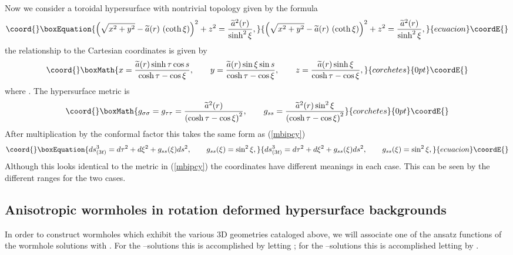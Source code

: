 \documentclass[a4paper,preprint,prabib,aps]{revtex4}
\begin{document}
Now we consider a toroidal hypersurface with nontrivial topology given by
the formula
\begin{equation}\coord{}\boxEquation{
\left( \sqrt{x^2+y^2}-\widetilde{a}(r)\ (\coth \xi )\right) ^2+z^2= \frac{
\widetilde{a}^2(r)}{\sinh ^2\xi },  \label{torus}
}{
\left( \sqrt{x^2+y^2}-\widetilde{a}(r)\ (\coth \xi )\right) ^2+z^2= \frac{
\widetilde{a}^2(r)}{\sinh ^2\xi },  }{ecuacion}\coordE{}\end{equation}
the relationship to the Cartesian coordinates is given by
\[\coord{}\boxMath{
x =\frac{\widetilde{a}(r)\sinh \tau \cos s}{\cosh \tau -\cos \xi },\qquad y=%
\frac{\widetilde{a}(r)\sin \xi \sin s}{\cosh \tau -\cos \xi }, \qquad z =
\frac{\widetilde{a}(r)\sinh \xi }{\cosh \tau -\cos \xi },
}{corchetes}{0pt}\coordE{}\]
where \coordHE{}. The hypersurface
metric is
\[\coord{}\boxMath{
g_{\sigma \sigma }=g_{\tau \tau }=\frac{\widetilde{a}^2(r)}{\left( \cosh
\tau -\cos \xi \right) ^2} , \qquad g_{ss}=\frac{\widetilde{a}^2(r)\sin
^2\xi } {\left( \cosh \tau -\cos \xi \right) ^2}
}{corchetes}{0pt}\coordE{}\]
After multiplication by the conformal factor \coordHE{} this takes the same form as (\ref{mbipcy})
\begin{equation}\coord{}\boxEquation{  \label{mtor}
ds_{(3t)}^3 =d\tau ^2+d\xi ^2+g_{ss}(\xi )ds^2, \qquad g_{ss}(\xi ) =\sin
^2\xi ,
}{  ds_{(3t)}^3 =d\tau ^2+d\xi ^2+g_{ss}(\xi )ds^2, \qquad g_{ss}(\xi ) =\sin
^2\xi ,
}{ecuacion}\coordE{}\end{equation}
Although this looks identical to the metric in (\ref{mbipcy}) the
coordinates \coordHE{} have different meanings in each
case. This can be seen by the different ranges for the two cases.

\subsection{Anisotropic wormholes in rotation deformed hypersurface
backgrounds}

In order to construct wormholes which exhibit the various 3D geometries
cataloged above, we will associate one of the ansatz functions of the
wormhole solutions with \coordHE{}. For the \myHighlight{$\chi$}\coordHE{}--solutions this
is accomplished by letting \coordHE{}; for the \myHighlight{$\varphi$}\coordHE{}%
--solutions this is accomplished letting by \coordHE{}.
\end{document}
